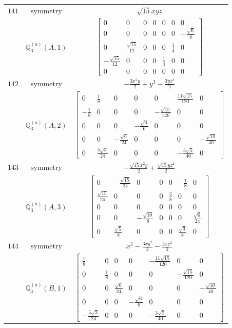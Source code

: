 \documentclass[fleqn,8pt,landscape]{jsarticle}
\begin{document}
\begin{longtable}{ccc}
$ 141 $ & $ \text{symmetry} $ & $ \sqrt{15} x y z $ \\
$  $ & $ \mathbb{Q}_{3}^{(a)}(A,1) $ & $ \begin{bmatrix} 0 & 0 & 0 & 0 & 0 & 0 & 0 \\ 0 & 0 & 0 & 0 & 0 & 0 & - \frac{\sqrt{6}}{6} \\ 0 & \frac{\sqrt{15}}{12} & 0 & 0 & 0 & \frac{1}{4} & 0 \\ - \frac{\sqrt{15}}{12} & 0 & 0 & 0 & \frac{1}{4} & 0 & 0 \\ 0 & 0 & 0 & 0 & 0 & 0 & 0 \end{bmatrix} $ \\ \hline
$ 142 $ & $ \text{symmetry} $ & $ - \frac{3 x^{2} y}{2} + y^{3} - \frac{3 y z^{2}}{2} $ \\
$  $ & $ \mathbb{Q}_{3}^{(a)}(A,2) $ & $ \begin{bmatrix} 0 & \frac{1}{8} & 0 & 0 & 0 & \frac{11 \sqrt{15}}{120} & 0 \\ - \frac{1}{8} & 0 & 0 & 0 & - \frac{\sqrt{15}}{120} & 0 & 0 \\ 0 & 0 & 0 & - \frac{\sqrt{6}}{6} & 0 & 0 & 0 \\ 0 & 0 & - \frac{\sqrt{6}}{24} & 0 & 0 & 0 & - \frac{\sqrt{10}}{40} \\ 0 & \frac{5 \sqrt{3}}{24} & 0 & 0 & 0 & - \frac{3 \sqrt{5}}{40} & 0 \end{bmatrix} $ \\ \hline
$ 143 $ & $ \text{symmetry} $ & $ - \frac{\sqrt{15} x^{2} y}{2} + \frac{\sqrt{15} y z^{2}}{2} $ \\
$  $ & $ \mathbb{Q}_{3}^{(a)}(A,3) $ & $ \begin{bmatrix} 0 & - \frac{\sqrt{15}}{24} & 0 & 0 & 0 & - \frac{1}{8} & 0 \\ \frac{\sqrt{15}}{24} & 0 & 0 & 0 & \frac{3}{8} & 0 & 0 \\ 0 & 0 & 0 & 0 & 0 & 0 & 0 \\ 0 & 0 & - \frac{\sqrt{10}}{8} & 0 & 0 & 0 & \frac{\sqrt{6}}{24} \\ 0 & \frac{\sqrt{5}}{8} & 0 & 0 & 0 & \frac{\sqrt{3}}{8} & 0 \end{bmatrix} $ \\ \hline
$ 144 $ & $ \text{symmetry} $ & $ x^{3} - \frac{3 x y^{2}}{2} - \frac{3 x z^{2}}{2} $ \\
$  $ & $ \mathbb{Q}_{3}^{(a)}(B,1) $ & $ \begin{bmatrix} \frac{1}{8} & 0 & 0 & 0 & - \frac{11 \sqrt{15}}{120} & 0 & 0 \\ 0 & \frac{1}{8} & 0 & 0 & 0 & - \frac{\sqrt{15}}{120} & 0 \\ 0 & 0 & \frac{\sqrt{6}}{24} & 0 & 0 & 0 & - \frac{\sqrt{10}}{40} \\ 0 & 0 & 0 & - \frac{\sqrt{6}}{6} & 0 & 0 & 0 \\ - \frac{5 \sqrt{3}}{24} & 0 & 0 & 0 & - \frac{3 \sqrt{5}}{40} & 0 & 0 \end{bmatrix} $ \\ \hline

\end{longtable}
\end{document}
